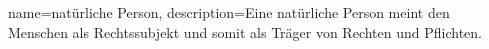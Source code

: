 {
name={natürliche Person},
description={\glqq Eine natürliche Person meint den Menschen als Rechtssubjekt und somit als Träger von Rechten und Pflichten.\grqq{} \cite{NatPerson_2018}}
}

